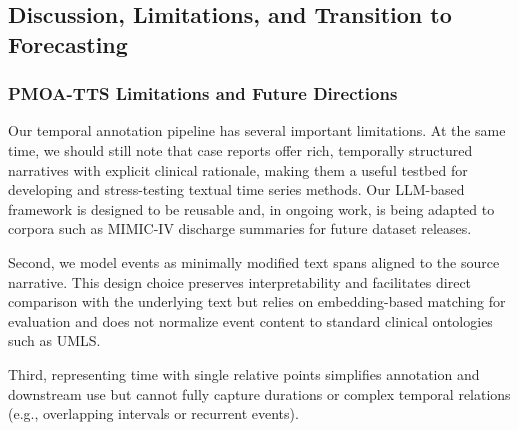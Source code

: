 \subsection{Discussion, Limitations, and Transition to Forecasting}
\label{ch05:sec:limitations-and-future-directions}

\ChFiveHeadingOnly

\subsubsection{PMOA-TTS Limitations and Future Directions}

Our temporal annotation pipeline has several important limitations.
At the same time, we should still note that case reports offer rich, temporally structured narratives with explicit clinical rationale, making them a useful testbed for developing and stress-testing textual time series methods.
Our LLM-based framework is designed to be reusable and, in ongoing work, is being adapted to corpora such as MIMIC-IV discharge summaries for future dataset releases.

Second, we model events as minimally modified text spans aligned to the source narrative.
This design choice preserves interpretability and facilitates direct comparison with the underlying text but relies on embedding-based matching for evaluation and does not normalize event content to standard clinical ontologies such as UMLS. 

Third, representing time with single relative points simplifies annotation and downstream use but cannot fully capture durations or complex temporal relations (e.g., overlapping intervals or recurrent events).

